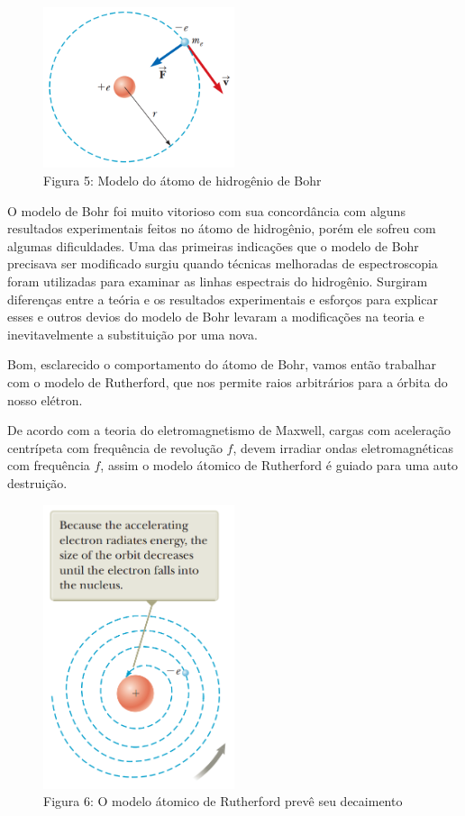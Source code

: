 \documentclass[12pt, letterpaper]{article}
\begin{document}
    \begin{figure}[h]
        \centering
        \includegraphics[width=0.5\textwidth]{bohr}
        \\{Figura 5: Modelo do átomo de hidrogênio de Bohr}
        \label{fig:bohr}
    \end{figure}

    O modelo de Bohr foi muito vitorioso com sua concordância com alguns resultados experimentais feitos no átomo de hidrogênio, porém ele sofreu com algumas dificuldades. Uma das primeiras indicações que o modelo de Bohr precisava ser modificado surgiu quando técnicas melhoradas de espectroscopia foram utilizadas para examinar as linhas espectrais do hidrogênio. Surgiram diferenças entre a teória e os resultados experimentais e esforços para explicar esses e outros devios do modelo de Bohr levaram a modificações na teoria e inevitavelmente a substituição por uma nova.

    \newpage
    Bom, esclarecido o comportamento do átomo de Bohr, vamos então trabalhar com o modelo de Rutherford, que nos permite raios arbitrários para a órbita do nosso elétron.

    De acordo com a teoria do eletromagnetismo de Maxwell, cargas com aceleração centrípeta com frequência de revolução $f$, devem irradiar ondas eletromagnéticas com frequência $f$, assim o modelo átomico de Rutherford é guiado para uma auto destruição. 

    \begin{figure}[H]
        \centering
        \includegraphics[width=0.5\textwidth]{ruth}
        \\{Figura 6: O modelo átomico de Rutherford prevê seu decaimento}
        \label{fig:ruth}
    \end{figure}
\end{document}
